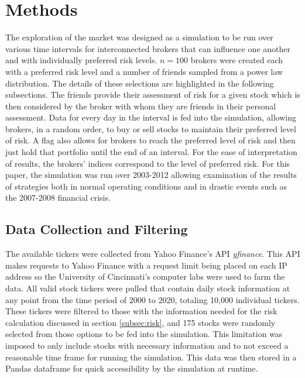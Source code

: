 \documentclass[letterpaper, 11 pt, proceedings]{IEEEtran}
\begin{document}
	\section{Methods}\label{sec:methods}
	The exploration of the market was designed as a simulation to be run over various time intervals for interconnected brokers that can influence one another and with individually preferred risk levels. $n=100$ brokers were created each with a preferred risk level and a number of friends sampled from a power law distribution. The details of these selections are highlighted in the following subsections. The friends provide their assessment of risk for a given stock which is then considered by the broker with whom they are friends in their personal assessment. Data for every day in the interval is fed into the simulation, allowing brokers, in a random order, to buy or sell stocks to maintain their preferred level of risk. A flag also allows for brokers to reach the preferred level of risk and then just hold that portfolio until the end of an interval. For the ease of interpretation of results, the brokers' indices correspond to the level of preferred risk. For this paper, the simulation was run over 2003-2012 allowing examination of the results of strategies both in normal operating conditions and in drastic events such as the 2007-2008 financial crisis.
	
	\subsection{Data Collection and Filtering}\label{subsec:data}
	The available tickers were collected from Yahoo Finance's API \textit{yfinance}. This API makes requests to Yahoo Finance with a request limit being placed on each IP address so the University of Cincinnati's computer labs were used to farm the data. All valid stock tickers were pulled that contain daily stock information at any point from the time period of 2000 to 2020, totaling 10,000 individual tickers. These tickers were filtered to those with the information needed for the risk calculation discussed in section \ref{subsec:risk}, and 175 stocks were randomly selected from those options to be fed into the simulation. This limitation was imposed to only include stocks with necessary information and to not exceed a reasonable time frame for running the simulation. This data was then stored in a Pandas dataframe for quick accessibility by the simulation at runtime.
	
\end{document}
